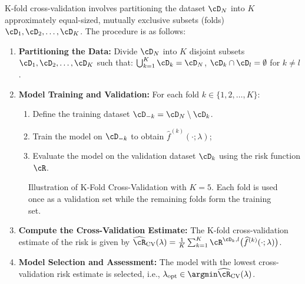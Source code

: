 K-fold cross-validation involves partitioning the dataset $\cD_N$ into $K$ approximately equal-sized, mutually exclusive subsets (folds) $\cD_1, \cD_2, \ldots, \cD_K$.
The procedure is as follows:

\begin{enumerate}
\item \textbf{Partitioning the Data:} Divide $\cD_N$ into $K$ disjoint subsets $\cD_1, \cD_2, \ldots, \cD_K$ such that: $\bigcup_{k=1}^K \cD_k = \cD_N$, $\cD_k \cap \cD_l = \emptyset$ for $k \ne l$.

\item \textbf{Model Training and Validation:} For each fold $k \in \{1, 2, \ldots, K\}$:
\begin{enumerate}
\item Define the training dataset $\cD_{-k} = \cD_N \setminus \cD_k$.
\item Train the model on $\cD_{-k}$ to obtain $\widehat{f}^{(k)}(\cdot; \lambda)$;
\item Evaluate the model on the validation dataset $\cD_k$ using the risk
function $\cR$.
\end{enumerate}
\end{enumerate}

\begin{figure}[h]\centering
\caption{Illustration of K-Fold Cross-Validation with $K = 5$. Each fold is used once as a validation set while the remaining folds form the training set.}\label{fig:ch4-kfold}
\end{figure}

\begin{enumerate}
\setcounter{enumi}{2}
\item \textbf{Compute the Cross-Validation Estimate:} The K-fold cross-validation
estimate of the risk is given by $\widehat{\cR}_{\mathrm{CV}}(\lambda) = \frac{1}{K} \sum_{k=1}^K \cR^{\cD_k, l}\bigl( \widehat{f}^{(k)}(\cdot; \lambda) \bigr)$.

\item \textbf{Model Selection and Assessment:} The model with the lowest cross-validation risk estimate is selected, i.e., $\lambda_{\mathrm{opt}} \in \argmin \widehat{\cR}_{\mathrm{CV}}(\lambda)$.
\end{enumerate}

